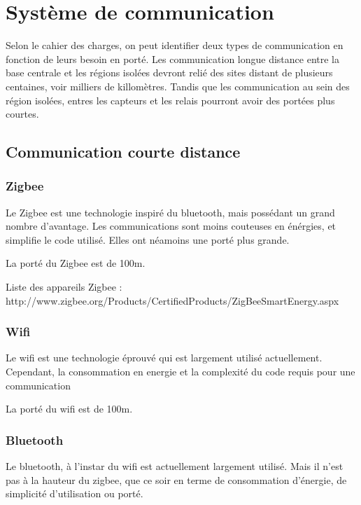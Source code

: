 \section{Système de communication}

Selon le cahier des charges, on peut identifier deux types de communication en fonction de leurs besoin en porté.
Les communication longue distance entre la base centrale et les régions isolées devront relié des sites distant de plusieurs centaines, voir milliers de killomètres.
Tandis que les communication au sein des région isolées, entres les capteurs et les relais pourront avoir des portées plus courtes.



    \subsection{Communication courte distance}


        \subsubsection{Zigbee}
            Le Zigbee est une technologie inspiré du bluetooth, mais possédant un grand nombre d'avantage.
            Les communications sont moins couteuses en énérgies, et simplifie le code utilisé.
            Elles ont néamoins une porté plus grande.
            
            La porté du Zigbee est de 100m.

            Liste des appareils Zigbee :\\
            http://www.zigbee.org/Products/CertifiedProducts/ZigBeeSmartEnergy.aspx

        \subsubsection{Wifi}
            Le wifi est une technologie éprouvé qui est largement utilisé actuellement.
            Cependant, la consommation en energie et la complexité du code requis pour une communication 
            
            La porté du wifi est de 100m.

        \subsubsection{Bluetooth}
            Le bluetooth, à l'instar du wifi est actuellement largement utilisé.
            Mais il n'est pas à la hauteur du zigbee, que ce soir en terme de consommation d'énergie, de simplicité d'utilisation ou porté.
            
